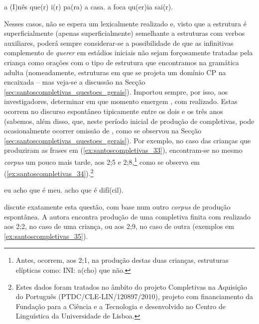 \documentclass[output=paper]{LSP/langsci}
\begin{document}
\ea\label{ex:santoscompletivas_33}
\ea\label{ex:santoscompletivas_33a} a  (I)nês que(r) i(r) pa(ra) a casa.
\ex\label{ex:santoscompletivas_33b} a foca qu(er)ia sai(r).
\zl

Nesses casos, não se espera um  lexicalmente realizado e, visto que a estrutura é superficialmente (apenas superficialmente) semelhante a estruturas com verbos auxiliares, poderá sempre considerar-se a possibilidade de que as infinitivas complemento de \textit{querer} em estádios iniciais não sejam forçosamente tratadas pela criança como orações com o tipo de estrutura que encontramos na gramática adulta (nomeadamente, estruturas em que se projeta um domínio CP na encaixada – mas veja-se a discussão na Secção \ref{sec:santoscompletivas_questoes_gerais}). Importou sempre, por isso, aos investigadores, determinar em que momento emergem , com  realizado. Estas ocorrem no discurso espontâneo tipicamente entre os dois e os três anos (sabemos, além disso, que, neste período inicial de produção de completivas, pode ocasionalmente ocorrer omissão de , como se observou na Secção \ref{sec:santoscompletivas_questoes_gerais}). Por exemplo, no caso das crianças que produziram as frases em (\ref{ex:santoscompletivas_33}), encontram-se no mesmo \textit{corpus}  um pouco mais tarde, aos 2;5 e 2;8,\footnote{Antes, ocorrem, aos 2;1, na produção destas duas crianças, estruturas elípticas como:
\ea\label{ex:santoscompletivas_i3}INI: a(cho) que não.
\z} como se observa em (\ref{ex:santoscompletivas_34}).\footnote{Estes dados foram tratados no âmbito do projeto Completivas na Aquisição do Português (PTDC/CLE-LIN/120897/2010), projeto com financiamento da Fundação para a Ciência e a Tecnologia e desenvolvido no Centro de Linguística da Universidade de Lisboa.}

\ea\label{ex:santoscompletivas_34}
\ea\label{ex:santoscompletivas_34a} eu acho que é meu.
\ex\label{ex:santoscompletivas_34b} acho que é difí(cil).
\zl

\citet{soares2006} discute exatamente esta questão, com base num outro \textit{corpus} de produção espontânea. A autora encontra produção de uma completiva finita com  realizado aos 2;2, no caso de uma criança, ou aos 2;9, no caso de outra (exemplos em \ref{ex:santoscompletivas_35}). 
\end{document}
